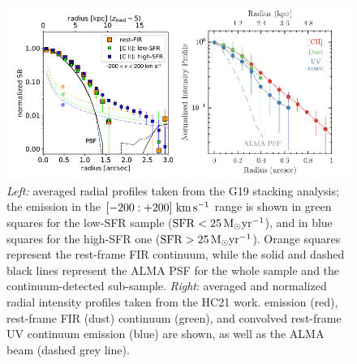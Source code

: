 \begin{figure}[t]
    \centering
    \includegraphics[width=1.0\textwidth]{plots/ginolfi_hc_final.png}
    \caption{\textit{Left:} averaged radial profiles taken from the G19 \citep{ginolfi:2019} stacking analysis; the \CII emission in the $[-200:+200]\,\,\rm km\,s^{-1}$ range is shown in green squares for the low-SFR sample ($\mathrm{SFR}<25\,{\rm M}_{\odot}\mathrm{yr}^{-1}$), and in blue squares for the high-SFR one ($\mathrm{SFR}>25\,{\rm M}_{\odot}\mathrm{yr}^{-1}$). Orange squares represent the rest-frame FIR continuum, while the solid and dashed black lines represent the ALMA PSF for the whole sample and the continuum-detected sub-sample. \textit{Right}: averaged and normalized radial intensity profiles taken from the HC21 \citep{herrera2021kiloparsec} work. \CII emission (red), rest-frame FIR (dust) continuum (green), and convolved rest-frame UV continuum emission (blue) are shown, as well as the ALMA beam (dashed grey line).
    }
    \label{fig:alpine_data}
\end{figure}

